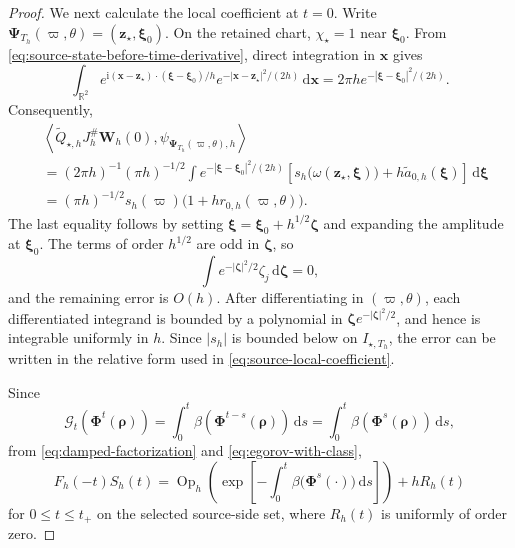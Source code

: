 \documentclass[11pt,reqno]{amsart}
\newcommand{\ii}{\mathrm{i}}
\newcommand{\dd}{\,\mathrm{d}}
\newcommand{\Op}{\operatorname{Op}}
\numberwithin{equation}{section}
\begin{document}
\begin{proof}
We next calculate the local coefficient at $t=0$. Write $\bm\Psi_{T_h}(\varpi,\theta)=(\bm z_\star,\bm\xi_0)$. On the retained chart, $\chi_\star=1$ near $\bm\xi_0$. From \eqref{eq:source-state-before-time-derivative}, direct integration in $\bm x$ gives
\begin{equation*}
 \int_{\mathbb R^2}e^{\ii(\bm x-\bm z_\star)\cdot(\bm\xi-\bm\xi_0)/h}e^{-|\bm x-\bm z_\star|^2/(2h)}\dd\bm x=2\pi h e^{-|\bm\xi-\bm\xi_0|^2/(2h)}.
\end{equation*}
Consequently,
\begin{equation}\label{eq:source-local-coefficient}
 \begin{aligned}
 &\left\langle \widetilde{Q}_{\star,h}J_h^{\#}\bm W_h(0),
 \psi_{\bm\Psi_{T_h}(\varpi,\theta),h}\right\rangle\\
 &=(2\pi h)^{-1}(\pi h)^{-1/2}
 \int e^{-|\bm\xi-\bm\xi_0|^2/(2h)}
 \left[s_h\bigl(\omega(\bm z_\star,\bm\xi)\bigr)
 +h\widetilde a_{0,h}(\bm\xi)\right]\dd\bm\xi\\
 &=(\pi h)^{-1/2}s_h(\varpi)
 \bigl(1+h r_{0,h}(\varpi,\theta)\bigr).
 \end{aligned}
\end{equation}
The last equality follows by setting $\bm\xi=\bm\xi_0+h^{1/2}\bm\zeta$ and expanding the amplitude at $\bm\xi_0$. The terms of order $h^{1/2}$ are odd in $\bm\zeta$, so
$$
    \int e^{-|\bm\zeta|^2/2}\zeta_j\dd\bm\zeta=0,    
$$  
and the remaining error is $O(h)$. After differentiating in $(\varpi,\theta)$, each differentiated integrand is bounded by a polynomial in $\bm\zeta e^{-|\bm\zeta|^2/2}$, and hence is integrable uniformly in $h$. Since $|s_h|$ is bounded below on $I_{\star,T_h}$, the error can be written in the relative form used in \eqref{eq:source-local-coefficient}.

Since 
\begin{equation*}
 \mathcal G_t(\bm\Phi^t(\bm\rho))=\int_0^t\beta(\bm\Phi^{t-s}(\bm\rho))\dd s=\int_0^t\beta(\bm\Phi^s(\bm\rho))\dd s,
\end{equation*}
from \eqref{eq:damped-factorization} and \eqref{eq:egorov-with-class},
\begin{equation}\label{eq:interaction-propagator}
 F_h(-t)S_h(t)=\Op_h\left(\exp\left[-\int_0^t\beta\bigl(\bm\Phi^s(\cdot)\bigr)\dd s\right]\right)+hR_h(t)
\end{equation}
for $0\le t\le t_+$ on the selected source-side set, where $R_h(t)$ is uniformly of order zero. 


\end{proof}
\end{document}
